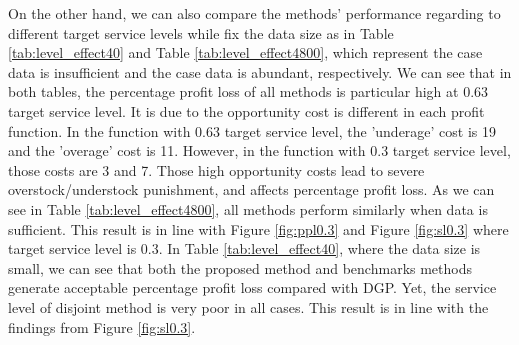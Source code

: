 \documentclass{article}
\begin{document}
\begin{table}[ht]
\caption{Size effect at 0.3 target service level}
\label{tab:size_effect0.3}
\centering {} 
\end{table}

On the other hand, we can also compare the methods' performance regarding to different target service levels while fix the data size as in Table \ref{tab:level_effect40} and Table \ref{tab:level_effect4800}, which represent the case data is insufficient and the case data is abundant, respectively. We can see that in both tables, the percentage profit loss of all methods is particular high at 0.63 target service level. It is due to the opportunity cost is different in each profit function. In the function with 0.63 target service level, the 'underage' cost is 19 and the 'overage' cost is 11. However, in the function with 0.3 target service level, those costs are 3 and 7. Those high opportunity costs lead to severe overstock/understock punishment, and affects percentage profit loss. As we can see in Table \ref{tab:level_effect4800}, all methods perform similarly when data is sufficient. This result is in line with Figure \ref{fig:ppl0.3} and Figure \ref{fig:sl0.3} where target service level is 0.3. In Table \ref{tab:level_effect40}, where the data size is small, we can see that both the proposed method and benchmarks methods generate acceptable percentage profit loss compared with DGP. Yet, the service level of disjoint method is very poor in all cases. This result is in line with the findings from Figure \ref{fig:sl0.3}.
\end{document}
